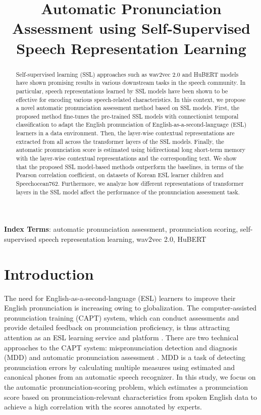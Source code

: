 \documentclass[a4paper]{article}
\title{Automatic Pronunciation Assessment using Self-Supervised Speech Representation Learning}
\begin{document}
\maketitle
% 
\begin{abstract}
Self-supervised learning (SSL) approaches such as wav2vec 2.0 and HuBERT models have shown promising results in various downstream tasks in the speech community. In particular, speech representations learned by SSL models have been shown to be effective for encoding various speech-related characteristics. In this context, we propose a novel automatic pronunciation assessment method based on SSL models. First, the proposed method fine-tunes the pre-trained SSL models with connectionist temporal classification to adapt the English pronunciation of English-as-a-second-language (ESL) learners in a data environment. Then, the layer-wise contextual representations are extracted from all across the transformer layers of the SSL models. Finally, the automatic pronunciation score is estimated using bidirectional long short-term memory with the layer-wise contextual representations and the corresponding text. We show that the proposed SSL model-based methods outperform the baselines, in terms of the Pearson correlation coefficient, on datasets of Korean ESL learner children and Speechocean762. Furthermore, we analyze how different representations of transformer layers in the SSL model affect the performance of the pronunciation assessment task. 
\end{abstract}
\noindent\textbf{Index Terms}: automatic pronunciation assessment, pronunciation scoring, self-supervised speech representation learning, wav2vec 2.0, HuBERT

\section{Introduction}
The need for English-as-a-second-language (ESL) learners to improve their English pronunciation is increasing owing to globalization. The computer-assisted pronunciation training (CAPT) system, which can conduct assessments and provide detailed feedback on pronunciation proficiency, is thus attracting attention as an ESL learning service and platform \cite{rogerson2021computer, kyriakopoulos2021deep}. There are two technical approaches to the CAPT system: mispronunciation detection and diagnosis (MDD) \cite{ zechner2009automatic,leung2019cnn, yan2020end,lin2021attention,lo2020effective,feng2020sed,lo2021improving,peng21e_interspeech, wu21h_interspeech,xu21k_interspeech} and automatic pronunciation assessment \cite{lin2021attention,li2011context,witt2000phone,yu2015using,chen2018end,Kyriakopoulos2018,peng21e_interspeech}. MDD is a task of detecting pronunciation errors by calculating multiple measures using estimated and canonical phones from an automatic speech recognizer. In this study, we focus on the automatic pronunciation-scoring problem, which estimates a pronunciation score based on pronunciation-relevant characteristics from spoken English data to achieve a high correlation with the scores annotated by experts.
\end{document}

